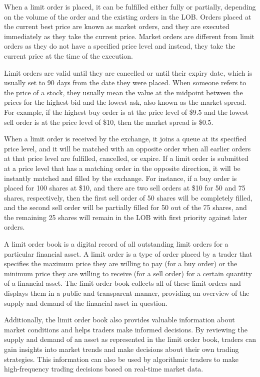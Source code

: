 \documentclass[
  12pt,
  a4paper,
  DIV=11,
  numbers=noendperiod]{scrartcl}
\begin{document}
When a limit order is placed, it can be fulfilled either fully or
partially, depending on the volume of the order and the existing orders
in the LOB. Orders placed at the current best price are known as market
orders, and they are executed immediately as they take the current
price. Market orders are different from limit orders as they do not have
a specified price level and instead, they take the current price at the
time of the execution.

Limit orders are valid until they are cancelled or until their expiry
date, which is usually set to 90 days from the date they were placed.
When someone refers to the price of a stock, they usually mean the value
at the midpoint between the prices for the highest bid and the lowest
ask, also known as the market spread. For example, if the highest buy
order is at the price level of \$9.5 and the lowest sell order is at the
price level of \$10, then the market spread is \$0.5.

When a limit order is received by the exchange, it joins a queue at its
specified price level, and it will be matched with an opposite order
when all earlier orders at that price level are fulfilled, cancelled, or
expire. If a limit order is submitted at a price level that has a
matching order in the opposite direction, it will be instantly matched
and filled by the exchange. For instance, if a buy order is placed for
100 shares at \$10, and there are two sell orders at \$10 for 50 and 75
shares, respectively, then the first sell order of 50 shares will be
completely filled, and the second sell order will be partially filled
for 50 out of the 75 shares, and the remaining 25 shares will remain in
the LOB with first priority against later orders.

A limit order book is a digital record of all outstanding limit orders
for a particular financial asset. A limit order is a type of order
placed by a trader that specifies the maximum price they are willing to
pay (for a buy order) or the minimum price they are willing to receive
(for a sell order) for a certain quantity of a financial asset. The
limit order book collects all of these limit orders and displays them in
a public and transparent manner, providing an overview of the supply and
demand of the financial asset in question.

Additionally, the limit order book also provides valuable information
about market conditions and helps traders make informed decisions. By
reviewing the supply and demand of an asset as represented in the limit
order book, traders can gain insights into market trends and make
decisions about their own trading strategies. This information can also
be used by algorithmic traders to make high-frequency trading decisions
based on real-time market data.
\end{document}
